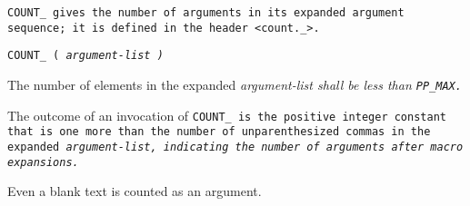 \tt{COUNT_} gives the number of arguments in its expanded argument sequence;
it is defined in the header \tt{<count._>}.


\tt{COUNT_ (} \it{argument-list} \tt{)}


The number of elements in the expanded
\it{argument-list} shall be less than \tt{PP_MAX}.


The outcome of an invocation of \tt{COUNT_} is the positive integer constant
that is one more than the number of unparenthesized commas in the expanded
\it{argument-list}, indicating the number of arguments after macro expansions.

\note Even a blank text is counted as an argument.
